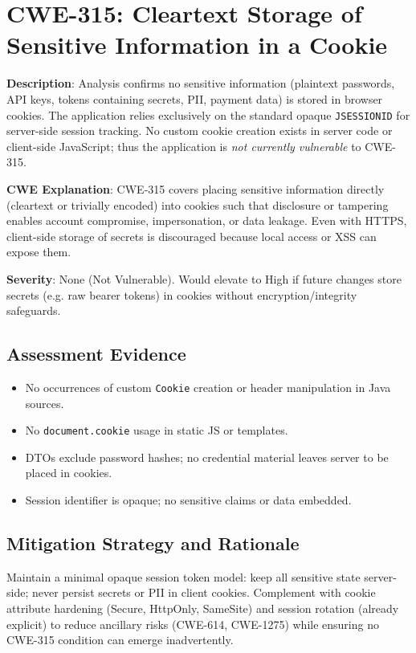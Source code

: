 \documentclass[]{UCD_CS_FYP_Report}
\begin{document}
\section{CWE-315: Cleartext Storage of Sensitive Information in a Cookie}

	\textbf{Description}: Analysis confirms no sensitive information (plaintext passwords, API keys, tokens containing secrets, PII, payment data) is stored in browser cookies. The application relies exclusively on the standard opaque \texttt{JSESSIONID} for server-side session tracking. No custom cookie creation exists in server code or client-side JavaScript; thus the application is \emph{not currently vulnerable} to CWE-315.

	\textbf{CWE Explanation}: CWE-315 covers placing sensitive information directly (cleartext or trivially encoded) into cookies such that disclosure or tampering enables account compromise, impersonation, or data leakage. Even with HTTPS, client-side storage of secrets is discouraged because local access or XSS can expose them.

	\textbf{Severity}: None (Not Vulnerable). Would elevate to High if future changes store secrets (e.g. raw bearer tokens) in cookies without encryption/integrity safeguards.

\subsection*{Assessment Evidence}
\begin{itemize}
	\item No occurrences of custom \texttt{Cookie} creation or header manipulation in Java sources.
	\item No \texttt{document.cookie} usage in static JS or templates.
	\item DTOs exclude password hashes; no credential material leaves server to be placed in cookies.
	\item Session identifier is opaque; no sensitive claims or data embedded.
\end{itemize}

\subsection*{Mitigation Strategy and Rationale}
Maintain a minimal opaque session token model: keep all sensitive state server-side; never persist secrets or PII in client cookies. Complement with cookie attribute hardening (Secure, HttpOnly, SameSite) and session rotation (already explicit) to reduce ancillary risks (CWE-614, CWE-1275) while ensuring no CWE-315 condition can emerge inadvertently.
\end{document}
